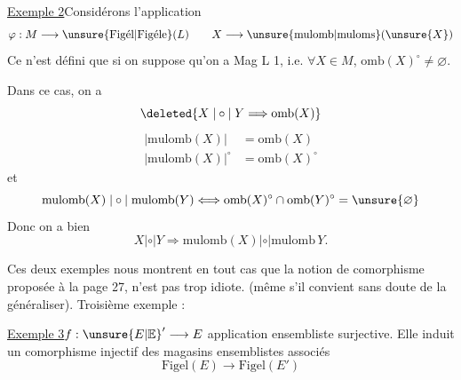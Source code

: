 \uline{Exemple 2}\quad Considérons l'application
\[
\varphi:M\longrightarrow\unsure{\mathrm{Fig\acute{e}l}|\mathrm{Fig\acute{e}le}}(L)\qquad X\longrightarrow\unsure{\mathrm{mulomb}|\mathrm{muloms}}(\unsure{X})
\]
Ce n'est défini  que si on suppose qu'on a Mag L 1, i.e. $\forall X\in M$, $\mathrm{omb}(X)^\circ\ne\varnothing$.

Dans ce cas, on a 
\[
\deleted{X\mathrel{|\circ|}Y\Longrightarrow\mathrm{omb}(X)}
\]
\[
\begin{aligned}
|\mathrm{mulomb}(X)|&=\mathrm{omb}(X)\\
|\mathrm{mulomb}(X)|^\circ&=\mathrm{omb}(X)^\circ
\end{aligned}
\]
et
\[
\mathrm{mulomb}(X)\mathrel{|\circ|}\mathrm{mulomb}(Y)\Longleftrightarrow\mathrm{omb}(X)^\circ\cap\mathrm{omb}(Y)^\circ=\unsure{\varnothing}
\]
Donc on a bien
\[
X\mathrel{|\circ|}Y\Longrightarrow\mathrm{mulomb}(X)\mathrel{|\circ|}\mathrm{mulomb}\,Y.
\]

Ces deux exemples nous montrent en tout cas que la notion de comorphisme proposée à la page 27, n'est pas trop idiote. (même s'il convient sans doute de la généraliser). Troisième exemple :

\uline{Exemple 3}\quad $f:\unsure{E|\mathbb{E}}'\longrightarrow E$ application ensembliste surjective. Elle induit un comorphisme injectif des magasins ensemblistes associés
\[
\mathrm{Figel}(E)\longrightarrow\mathrm{Figel}(E')
\]
